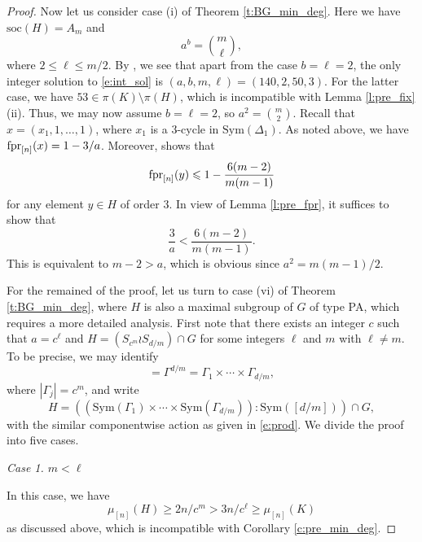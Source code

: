 \documentclass[twoside,a4paper,reqno,11pt]{amsart}
\newcommand{\<}{\langle}
\renewcommand{\>}{\rangle}
\newcommand{\leqs}{\leqslant}
\newcommand{\geqs}{\geqslant}
\newcommand{\vs}{\vspace{2mm}}
\newcommand{\fpr}{\mbox{{\rm fpr}}}
\newcommand{\soc}{\mathrm{soc}}
\theoremstyle{definition}
\begin{document}
\begin{proof}
		Now let us consider case (i) of Theorem \ref{t:BG_min_deg}. Here we have $\soc(H) = A_m$ and
		\begin{equation}
		\label{e:int_sol}
		a^b = {m\choose \ell},
		\end{equation}
		where $2\leqs\ell\leqs m/2$. By \cite[Theorem 2]{G_dio}, we see that apart from the case $b = \ell = 2$, the only integer solution to \eqref{e:int_sol} is $(a,b,m,\ell) = (140,2,50,3)$. For the latter case, we have $53\in\pi(K)\setminus\pi(H)$, which is incompatible with Lemma \ref{l:pre_fix}(ii). Thus, we may now assume $b = \ell = 2$, so $a^2 = {m\choose 2}$. Recall that $x = (x_1,1,\dots,1)$, where $x_1$ is a $3$-cycle in $\mathrm{Sym}(\Delta_1)$. As noted above, we have $\fpr_{[n]}(x) = 1-3/a$. Moreover, \cite[Proposition 3.4]{BG_min_deg} shows that
		\begin{equation*}
		\fpr_{[n]}(y)\leqs 1-\frac{6(m-2)}{m(m-1)}
		\end{equation*}
		for any element $y\in H$ of order $3$.
		In view of Lemma \ref{l:pre_fpr}, it suffices to show that
		\begin{equation*}
		\frac{3}{a} < \frac{6(m-2)}{m(m-1)}.
		\end{equation*}
		This is equivalent to $m-2 > a$, which is obvious since $a^2 = m(m-1)/2$.
		
		For the remained of the proof, let us turn to case (vi) of Theorem \ref{t:BG_min_deg}, where $H$ is also a maximal subgroup of $G$ of type PA, which requires a more detailed analysis. First note that there exists an integer $c$ such that $a = c^\ell$ and $H = (S_{c^m}\wr S_{d/m})\cap G$ for some integers $\ell$ and $m$ with $\ell\ne m$. To be precise, we may identify
		\begin{equation*}
		[n] = \Gamma^{d/m} = \Gamma_1\times \cdots\times\Gamma_{d/m},
		\end{equation*}
		where $|\Gamma_j| = c^m$, and write
		\begin{equation*}
		H = ((\mathrm{Sym}(\Gamma_1)\times\cdots\times\mathrm{Sym}(\Gamma_{d/m})){:}\mathrm{Sym}([d/m]))\cap G,
		\end{equation*}
		with the similar componentwise action as given in \eqref{e:prod}. We divide the proof into five cases.
		
		\vs
		
		\noindent \emph{Case 1. $m<\ell$}
		
		\vs
		
		In this case, we have
		\begin{equation*}
		\mu_{[n]}(H)\geqs 2n/c^m > 3n/c^\ell \geqs \mu_{[n]}(K)
		\end{equation*}
		as discussed above, which is incompatible with Corollary \ref{c:pre_min_deg}.
		

\end{proof}
\end{document}
